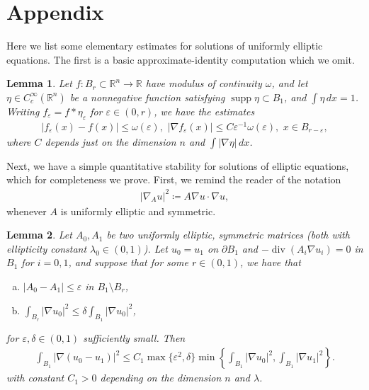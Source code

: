\documentclass[12pt,leqno]{amsart}
\numberwithin{equation}{section}
\newtheorem{lemma}{Lemma}[section]
\theoremstyle{definition}
\newcommand{\R}{\mathbb{R}}
\renewcommand{\epsilon}{\varepsilon}
\newcommand{\ra}{\rightarrow}
\newcommand{\abs}[1]{\left \lvert #1 \right \rvert}
\DeclareMathOperator{\divv}{\mathrm{div}}
\DeclareMathOperator{\spt}{\mathrm{supp}}
\begin{document}
	

	\section{Appendix}
	
	Here we list some elementary estimates for solutions of uniformly elliptic equations. The first is a basic approximate-identity computation which we omit.
	
	\begin{lemma}\label{lem:approx_id}
		Let $f: B_r \subset \R^n \ra \R$ have modulus of continuity $\omega$, and let $\eta \in C^\infty_c(\R^n)$ be a nonnegative function satisfying $\spt \eta \subset B_{1}$, and $\int \eta \, dx= 1$. Writing $f_\epsilon = f * \eta_\epsilon$ for $\epsilon \in (0,r)$, we have the estimates
		\begin{align*}
			\abs{f_\epsilon(x) - f(x)} \le \omega(\epsilon), \, \, 	\abs{\nabla f_\epsilon(x)} \le C \epsilon^{-1} \omega(\epsilon), \, \, x \in B_{r - \epsilon},
		\end{align*}
		where $C$ depends just on the dimension $n$ and $\int  \abs{ \nabla \eta} \, dx $. 
	\end{lemma}
	
	
	
	Next, we have a simple quantitative stability for solutions of elliptic equations, which for completeness we prove. First, we remind the reader of the notation
	\begin{align*}
		\abs{\nabla_A u}^2 \coloneqq A \nabla u \cdot \nabla u,
	\end{align*}
	whenever $A$ is uniformly elliptic and symmetric.
	
	


	\begin{lemma}\label{lem:qst2_fix}
		Let $A_0, A_1$ be two uniformly elliptic, symmetric matrices (both with ellipticity constant $\lambda_0 \in (0,1)$). Let $u_0 = u_1$ on $\partial B_1$ and $-\divv(A_i \nabla u_i) =0$ in $B_1$ for $i=0,1$, and suppose that for some $r \in (0,1)$, we have that 
		\begin{enumerate}[(a)]
			\item $\abs{A_0 - A_1} \le \epsilon$ in $B_1 \setminus B_r$, \label{cond:qst1_fix}
			\item $\int_{B_r} \abs{\nabla u_0}^2 \le \delta  \int_{B_1} \abs{\nabla u_0}^2$, \label{cond:qst2_fix}
		\end{enumerate}
		for $\epsilon, \delta \in (0,1)$ sufficiently small. Then 
		\begin{align*}
			\int_{ B_1} \abs{ \nabla (u_0 - u_1) }^2 \le C_1 \max\{\epsilon^2, \delta \} \min \left \{  \int_{B_1} \abs{ \nabla u_0}^2, \int_{B_1} \abs{ \nabla u_1}^2 \right \}.
		\end{align*}
		with constant $C_1 >0$ depending on the dimension $n$ and $\lambda$.
	\end{lemma}
	
\end{document}
